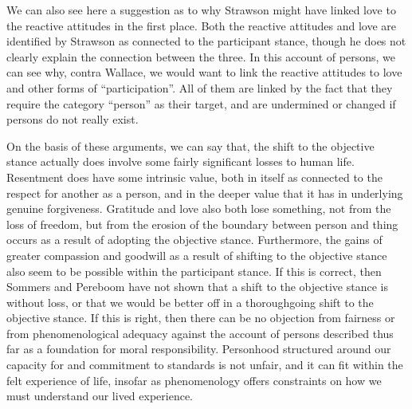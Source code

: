 \documentclass[phd,12pt,oneside,paper=letterpaper]{ubcthesis}
\begin{document}
We can also see here a suggestion as to why Strawson might have linked love to the reactive attitudes in the first place. Both the reactive attitudes and love are identified by Strawson as connected to the participant stance, though he does not clearly explain the connection between the three. In this account of persons, we can see why, contra Wallace, we would want to link the reactive attitudes to love and other forms of ``participation''. All of them are linked by the fact that they require the category ``person'' as their target, and are undermined or changed if persons do not really exist. 

On the basis of these arguments, we can say that, the shift to the objective stance actually does involve some fairly significant losses to human life. Resentment does have some intrinsic value, both in itself as connected to the respect for another as a person, and in the deeper value that it has in underlying genuine forgiveness. Gratitude and love also both lose something, not from the loss of freedom, but from the erosion of the boundary between person and thing occurs as a result of adopting the objective stance. Furthermore, the gains of greater compassion and goodwill as a result of shifting to the objective stance also seem to be possible within the participant stance. If this is correct, then Sommers and Pereboom have not shown that a shift to the objective stance is without loss, or that we would be better off in a thoroughgoing shift to the objective stance.  If this is right, then there can be no objection from fairness or from phenomenological adequacy against the account of persons described thus far as a foundation for moral responsibility. Personhood structured around our capacity for and commitment to standards is not unfair, and it can fit within the felt experience of life, insofar as phenomenology offers constraints on how we must understand our lived experience. 
\end{document}
